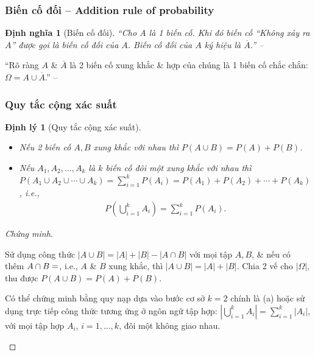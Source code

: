 \documentclass[oneside]{book}
\numberwithin{equation}{section}
\newtheorem{dinhnghia}{Định nghĩa}[section]
\newtheorem{dinhly}{Định lý}[section]
\begin{document}
\subsubsection{Biến cố đối -- Addition rule of probability}

\begin{dinhnghia}[Biến cố đối]
	``Cho $A$ là 1 biến cố. Khi đó biến cố ``Không xảy ra $A$'' được gọi là \emph{biến cố đối} của $A$. Biến cố đối của $A$ ký hiệu là $\overline{A}$.'' -- \cite[p. 99]{TL_chuyen_Toan_Dai_So_Giai_Tich_11}
\end{dinhnghia}
``Rõ ràng $A$ \& $\overline{A}$ là 2 biến cố xung khắc \& hợp của chúng là 1 biến cố chắc chắn: $\Omega = A\cup\overline{A}$.'' -- \cite[p. 100]{TL_chuyen_Toan_Dai_So_Giai_Tich_11}

\subsubsection{Quy tắc cộng xác suất}

\begin{dinhly}[Quy tắc cộng xác suất]
	\begin{itemize}
		\item[(a)] Nếu 2 biến cố $A,B$ xung khắc với nhau thì $P(A\cup B) = P(A) + P(B)$.
		\item[(b)] Nếu $A_1,A_2,\ldots,A_k$ là $k$ biến cố đôi một xung khắc với nhau thì $P\left(A_1\cup A_2\cup\cdots\cup A_k\right) = \sum_{i=1}^k P(A_i) = P(A_1) + P(A_2) + \cdots + P(A_k)$, i.e.,
		\begin{align*}
			P\left(\bigcup_{i=1}^k A_i\right) = \sum_{i=1}^k P(A_i).
		\end{align*}
	\end{itemize}	
\end{dinhly}

\begin{proof}[Chứng minh]
	\begin{enumerate*}
		\item[(a)] Sử dụng công thức $|A\cup B| = |A| + |B| - |A\cap B|$ với mọi tập $A,B$, \& nếu có thêm $A\cap B = \empty$, i.e., $A$ \& $B$ xung khắc, thì $|A\cup B| = |A| + |B|$. Chia 2 vế cho $|\Omega|$, thu được $P(A\cup B) = P(A) + P(B)$.
		\item[(b)] Có thể chứng minh bằng quy nạp dựa vào bước cơ sở $k = 2$ chính là (a) hoặc sử dụng trực tiếp công thức tương ứng ở ngôn ngữ tập hợp: $|\bigcup_{i=1}^k A_i| = \sum_{i=1}^k |A_i|$, với mọi tập hợp $A_i$, $i = 1,\ldots,k$, đôi một không giao nhau.
	\end{enumerate*}
\end{proof}
\end{document}
